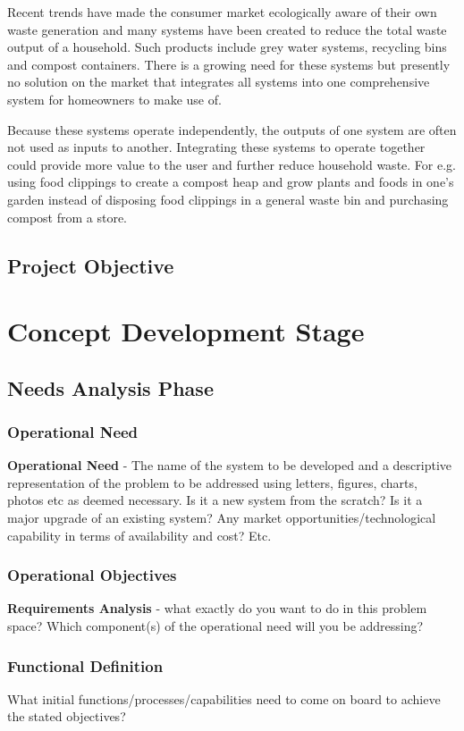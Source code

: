 \documentclass[a4paper,11pt,fleqn]{report}
\begin{document}
Recent trends have made the consumer market ecologically aware of their own waste generation and many systems have been created to reduce the total waste output of a household. Such products include grey water systems, recycling bins and compost containers. There is a growing need for these systems but presently no solution on the market that integrates all systems into one comprehensive system for homeowners to make use of.
  
Because these systems operate independently, the outputs of one system are often not used as inputs to another. Integrating these systems to operate together could provide more value to the user and further reduce household waste. For e.g. using food clippings to create a compost heap and grow plants and foods in one's garden instead of disposing food clippings in a general waste bin and purchasing compost from a store.

\section{Project Objective} \label{sec: Project Objective}

\chapter{Concept Development Stage}
\section{Needs Analysis Phase} \label{sec: Needs Analysis Phase}
\subsection{Operational Need} \label{Ssec: Operational Need}
\textbf{Operational Need} - The name of the system to be developed and a descriptive representation of the problem to be addressed using letters, figures, charts, photos etc as deemed necessary. Is it a new system from the scratch? Is it a major upgrade of an existing system? Any market opportunities/technological capability in terms of availability and cost? Etc.
\subsection{Operational Objectives}
\textbf{Requirements Analysis} - what exactly do you want to do in this problem space? Which component(s) of the operational need will you be addressing?

\subsection{Functional Definition}
What initial functions/processes/capabilities need to come on board to
achieve the stated objectives?
\end{document}
